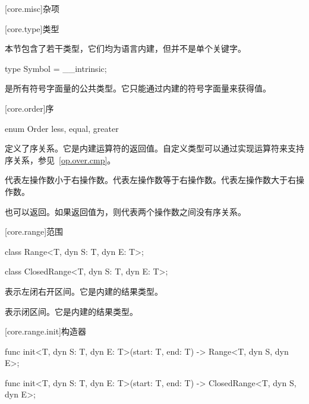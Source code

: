 
[core.misc]{杂项}

[core.type]{类型}

\pnum
本节包含了若干类型，它们均为语言内建，但并不是单个关键字。

\begin{itemdecl}
type Symbol = __intrinsic;
\end{itemdecl}

\pnum
{}是所有符号字面量的公共类型。它只能通过内建的符号字面量来获得值。

[core.order]{序}

\begin{itemdecl}
enum Order {
    less,
    equal,
    greater
}
\end{itemdecl}

\pnum
{}定义了序关系。它是内建运算符的返回值。自定义类型可以通过实现运算符来支持序关系，参见~\ref{op.over.cmp}。

\pnum
{}代表左操作数小于右操作数。代表左操作数等于右操作数。代表左操作数大于右操作数。

\pnum
{}也可以返回。如果返回值为，则代表两个操作数之间没有序关系。

[core.range]{范围}

\begin{itemdecl}
class Range<T, dyn S: T, dyn E: T>;
\end{itemdecl}

\begin{itemdecl}
class ClosedRange<T, dyn S: T, dyn E: T>;
\end{itemdecl}

\pnum
{}表示左闭右开区间。它是内建的结果类型。

\pnum
{}表示闭区间。它是内建的结果类型。

[core.range.init]{构造器}

\begin{itemdecl}
func init<T, dyn S: T, dyn E: T>(start: T, end: T) -> Range<T, dyn S, dyn E>;
\end{itemdecl}

\begin{itemdecl}
func init<T, dyn S: T, dyn E: T>(start: T, end: T) -> ClosedRange<T, dyn S, dyn E>;
\end{itemdecl}

